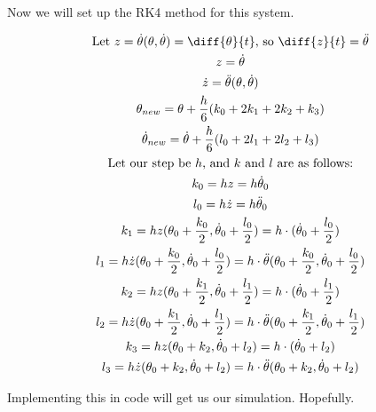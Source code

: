 \documentclass[]{article}
\begin{document}
Now we will set up the RK4 method for this system.

\begin{gather*}
	\text{Let } z = \dot{\theta}(\theta, \dot{\theta}) = \diff{\theta}{t} \text{, so } \diff{z}{t} = \ddot{\theta} \\
	z = \dot{\theta} \\
	\dot{z} = \ddot{\theta}(\theta, \dot{\theta}) \\
	\theta_{new} = \theta + \frac{h}{6}(k_0 + 2k_1 + 2k_2 + k_3) \\
	\dot{\theta}_{new} = \dot{\theta} + \frac{h}{6}(l_0 + 2l_1 + 2l_2 + l_3) \\
	\text{Let our step be $h$, and $k$ and $l$ are as follows:}\\
	k_0 = hz = h\dot{\theta}_0 \\
	l_0 = h\dot{z} = h\ddot{\theta}_0 \\
	k_1 = hz(\theta_0 + \frac{k_0}{2}, \dot{\theta}_0 + \frac{l_0}{2}) = h\cdot(\dot{\theta}_0 + \frac{l_0}{2}) \\
	l_1 = h\dot{z}(\theta_0 + \frac{k_0}{2}, \dot{\theta}_0 + \frac{l_0}{2}) = h\cdot\ddot{\theta}(\theta_0 + \frac{k_0}{2}, \dot{\theta}_0 + \frac{l_0}{2}) \\
	k_2 = hz(\theta_0 + \frac{k_1}{2}, \dot{\theta}_0 + \frac{l_1}{2}) = h\cdot(\dot{\theta}_0 + \frac{l_1}{2}) \\
	l_2 = h\dot{z}(\theta_0 + \frac{k_1}{2}, \dot{\theta}_0 + \frac{l_1}{2}) = h\cdot\ddot{\theta}(\theta_0 + \frac{k_1}{2}, \dot{\theta}_0 + \frac{l_1}{2}) \\
	k_3 = hz(\theta_0 + k_2, \dot{\theta}_0 + l_2) = h\cdot(\dot{\theta}_0 + l_2) \\
	l_3 = h\dot{z}(\theta_0 + k_2, \dot{\theta}_0 + l_2) = h\cdot\ddot{\theta}(\theta_0 + k_2, \dot{\theta}_0 + l_2)
\end{gather*}

Implementing this in code will get us our simulation. Hopefully.
\end{document}

